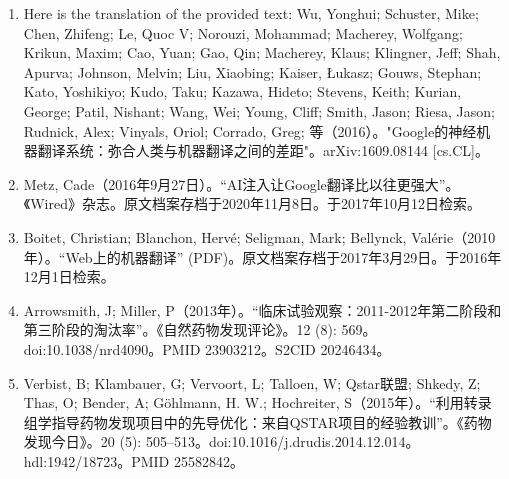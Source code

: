 \begin{enumerate}
\item Here is the translation of the provided text:
Wu, Yonghui; Schuster, Mike; Chen, Zhifeng; Le, Quoc V; Norouzi, Mohammad; Macherey, Wolfgang; Krikun, Maxim; Cao, Yuan; Gao, Qin; Macherey, Klaus; Klingner, Jeff; Shah, Apurva; Johnson, Melvin; Liu, Xiaobing; Kaiser, Łukasz; Gouws, Stephan; Kato, Yoshikiyo; Kudo, Taku; Kazawa, Hideto; Stevens, Keith; Kurian, George; Patil, Nishant; Wang, Wei; Young, Cliff; Smith, Jason; Riesa, Jason; Rudnick, Alex; Vinyals, Oriol; Corrado, Greg; 等（2016）。"Google的神经机器翻译系统：弥合人类与机器翻译之间的差距"。arXiv:1609.08144 [cs.CL]。
\item Metz, Cade（2016年9月27日）。“AI注入让Google翻译比以往更强大”。《Wired》杂志。原文档案存档于2020年11月8日。于2017年10月12日检索。
\item Boitet, Christian; Blanchon, Hervé; Seligman, Mark; Bellynck, Valérie（2010年）。“Web上的机器翻译” (PDF)。原文档案存档于2017年3月29日。于2016年12月1日检索。
\item Arrowsmith, J; Miller, P（2013年）。“临床试验观察：2011-2012年第二阶段和第三阶段的淘汰率”。《自然药物发现评论》。12 (8): 569。doi:10.1038/nrd4090。PMID 23903212。S2CID 20246434。
\item Verbist, B; Klambauer, G; Vervoort, L; Talloen, W; Qstar联盟; Shkedy, Z; Thas, O; Bender, A; Göhlmann, H. W.; Hochreiter, S（2015年）。“利用转录组学指导药物发现项目中的先导优化：来自QSTAR项目的经验教训”。《药物发现今日》。20 (5): 505–513。doi:10.1016/j.drudis.2014.12.014。hdl:1942/18723。PMID 25582842。
\end{enumerate}